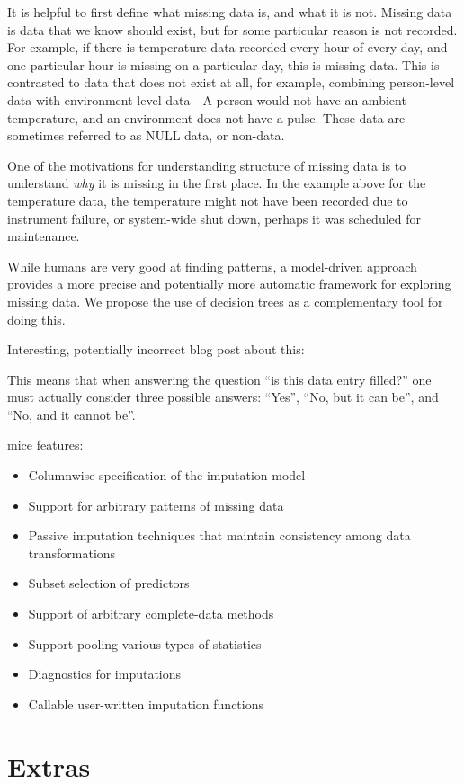 \documentclass[]{article}
\providecommand{\tightlist}{%
  \setlength{\itemsep}{0pt}\setlength{\parskip}{0pt}}
\begin{document}
It is helpful to first define what missing data is, and what it is not.
Missing data is data that we know should exist, but for some particular
reason is not recorded. For example, if there is temperature data
recorded every hour of every day, and one particular hour is missing on
a particular day, this is missing data. This is contrasted to data that
does not exist at all, for example, combining person-level data with
environment level data - A person would not have an ambient temperature,
and an environment does not have a pulse. These data are sometimes
referred to as NULL data, or non-data.

One of the motivations for understanding structure of missing data is to
understand \emph{why} it is missing in the first place. In the example
above for the temperature data, the temperature might not have been
recorded due to instrument failure, or system-wide shut down, perhaps it
was scheduled for maintenance.

While humans are very good at finding patterns, a model-driven approach
provides a more precise and potentially more automatic framework for
exploring missing data. We propose the use of decision trees as a
complementary tool for doing this.

Interesting, potentially incorrect blog post about this:

This means that when answering the question ``is this data entry
filled?'' one must actually consider three possible answers: ``Yes'',
``No, but it can be'', and ``No, and it cannot be''.

mice features:

\begin{itemize}
\tightlist
\item
  Columnwise specification of the imputation model
\item
  Support for arbitrary patterns of missing data
\item
  Passive imputation techniques that maintain consistency among data
  transformations
\item
  Subset selection of predictors
\item
  Support of arbitrary complete-data methods
\item
  Support pooling various types of statistics
\item
  Diagnostics for imputations
\item
  Callable user-written imputation functions
\end{itemize}

\section{Extras}\label{extras}
\end{document}
